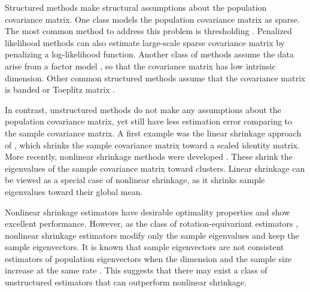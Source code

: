 \documentclass[useAMS,referee,usenatbib]{biom}
\begin{document}
Structured methods make structural assumptions about the population covariance matrix. One class models the population covariance matrix as sparse. The most common method to address this problem is thresholding \citep{rothman2009generalized, cai2011adaptive}. Penalized likelihood methods \citep{xue2012positive} can also estimate large-scale sparse covariance matrix by penalizing a log-likelihood function. Another class of methods assume the data arise from a factor model \citep{fan2008high}, so that the covariance matrix has low intrinsic dimension. Other common structured methods assume that the covariance matrix is banded \citep{li2017estimation} or Toeplitz matrix \citep{liu2017covariance}. 

In contrast, unstructured methods do not make any assumptions about the population covariance matrix, yet still have less estimation error comparing to the sample covariance matrix. A first example was the linear shrinkage approach of \citet{ledoit2004well}, which shrinks the sample covariance matrix toward a scaled identity matrix. More recently, nonlinear shrinkage methods were developed \citep{ledoit2012nonlinear, ledoit2019quadratic, lam2016nonparametric}. These shrink the eigenvalues of the sample covariance matrix toward clusters. Linear shrinkage can be viewed as a special case of nonlinear shrinkage, as it shrinks sample eigenvalues toward their global mean.

Nonlinear shrinkage estimators have desirable optimality properties \citep{ledoit2018analytical} and show excellent performance. However, as the class of rotation-equivariant estimators \citep{stein1975estimation, stein1986lectures}, nonlinear shrinkage estimators modify only the sample eigenvalues and keep the sample eigenvectors. It is known that sample eigenvectors are not consistent estimators of population eigenvectors when the dimension and the sample size increase at the same rate \citep{mestre2008asymptotic}. This suggests that there may exist a class of unstructured estimators that can outperform nonlinear shrinkage.

\end{document}
